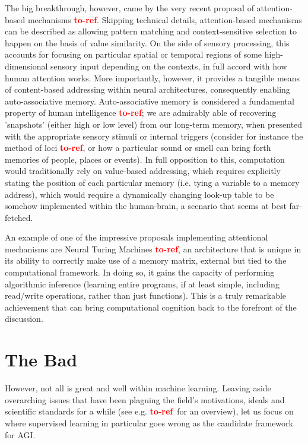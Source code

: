 \documentclass[]{article}
\newcommand\toref{\textcolor{red}{\bf{to-ref}}}
\begin{document}
The big breakthrough, however, came by the very recent proposal of attention-based mechanisms \toref . Skipping technical details, attention-based mechanisms can be described as allowing pattern matching and context-sensitive selection to happen on the basis of value similarity. On the side of sensory processing, this accounts for focusing on particular spatial or temporal regions of some high-dimensional sensory input depending on the contexts, in full accord with how human attention works. More importantly, however, it provides a tangible means of content-based addressing within neural architectures, consequently enabling auto-associative memory. Auto-associative memory is considered a fundamental property of human intelligence \toref ; we are admirably able of recovering 'snapshots' (either high or low level) from our long-term memory, when presented with the appropriate sensory stimuli or internal triggers (consider for instance the method of loci \toref , or how a particular sound or smell can bring forth memories of people, places or events). In full opposition to this, computation would traditionally rely on value-based addressing, which requires explicitly stating the position of each particular memory (i.e. tying a variable to a memory address), which would require a dynamically changing look-up table to be somehow implemented within the human-brain, a scenario that seems at best far-fetched.

An example of one of the impressive proposals implementing attentional mechanisms are Neural Turing Machines \toref , an architecture that is unique in its ability to correctly make use of a memory matrix, external but tied to the computational framework. In doing so, it gains the capacity of performing algorithmic inference (learning entire programs, if at least simple, including read/write operations, rather than just functions). This is a truly remarkable achievement that can bring computational cognition back to the forefront of the discussion.

\section{The Bad}
However, not all is great and well within machine learning. Leaving aside overarching issues that have been plaguing the field's motivations, ideals and scientific standards for a while (see e.g. \toref \ for an overview), let us focus on where supervised learning in particular goes wrong as the candidate framework for AGI.
\end{document}
